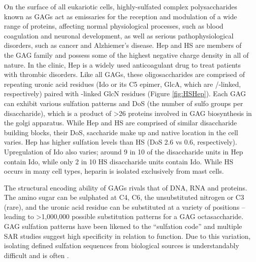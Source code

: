 \documentclass[journal=jctcce,manuscript=article]{achemso}
\begin{document}
{On the surface of all eukariotic cells, highly-sulfated complex polysaccharides known as \acp{GAG} act as emissaries for the reception and modulation of a wide range of proteins, affecting normal physiological processes, such as blood coagulation and neuronal development, as well as serious pathophysiological disorders, such as cancer and Alzhiemer's disease. 
\Ac{Hep} and \ac{HS} are members of the \ac{GAG} family and possess some of the highest negative charge density in all of nature. 
In the clinic, \ac{Hep} is a widely used anticoagulant drug to treat patients with thrombic disorders.\cite{Liu2014ChemoenzymaticHeparin.}
Like all \acp{GAG}, these oligosaccharides are comprised of repeating uronic acid residues (\ac{Ido} or its C5 epimer, \ac{GlcA}, which are \textalpha/-linked, respectively) paired with -linked \ac{GlcN} residues (Figure \ref{fig:HSHep}). 
Each \ac{GAG} can exhibit various sulfation patterns and \ac{DoS} (the number of sulfo groups per disaccharide), which is a product of \textgreater26 proteins involved in \ac{GAG} biosynthesis in the golgi apparatus.\cite{SoaresdaCosta2017SulfationDisorders, Varki2009BiologicalGlycans} 
While \ac{Hep} and \ac{HS} are comprised of similar disaccharide building blocks, their \ac{DoS}, saccharide make up and native location in the cell varies.
\ac{Hep} has higher sulfation levels than HS (\ac{DoS} 2.6 vs 0.6, respectively). 
Upregulation of \ac{Ido} also varies; around 9 in 10 of the disaccharide units in \ac{Hep} contain \ac{Ido}, while only 2 in 10 \ac{HS} disaccharide units contain \ac{Ido}. While \ac{HS} occurs in many cell types, heparin is isolated exclusively from mast cells.\cite{Liu2014ChemoenzymaticHeparin., Gandhi2008TheProteins}

% 

The structural encoding ability of \acp{GAG} rivals that of DNA, RNA and proteins.\cite{Gama2006SulfationActivity} The amino sugar can be sulphated at C4, C6, the unsubstituted nitrogen or C3 (rare), and the uronic acid residue can be substituted at a variety of positions -- leading to \textgreater1,000,000 possible substitution patterns for a \ac{GAG} octasaccharide.\cite{Gandhi2008TheProteins, SoaresdaCosta2017SulfationDisorders,Gama2006SulfationActivity} GAG sulfation patterns have been likened to the “sulfation code” and multiple \ac{SAR} studies suggest high specificity in relation to function.\cite{Habuchi2004SulfationCode, Gama2006SulfationActivity} Due to this variation, isolating defined sulfation sequences from biological sources is understandably difficult and is often \cite{Gama2006SulfationActivity}. 

}
\end{document}
